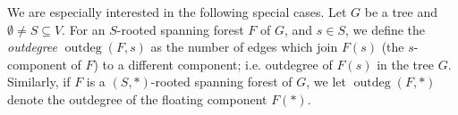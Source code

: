 \documentclass[12pt]{amsart}
\theoremstyle{definition}
\DeclareMathOperator{\outdeg}{outdeg}
\newcommand\farbod[1]{\footnote{[\textcolor{orange}{(Farbod)} \textcolor{blue}{#1}]}}
\begin{document}
We are especially interested in the following special cases. 
Let $G$ be a tree and $\emptyset \ne S \subseteq V$. 
For an $S$-rooted spanning forest $F$ of $G$, and $s \in S$, we define the {\em outdegree} $\outdeg(F,s)$ as the number of edges which join $F(s)$ (the $s$-component of $F$) to a different component; i.e. outdegree of $F(s)$ in the tree $G$. 
Similarly, if $F$ is a $(S,*)$-rooted spanning forest of $G$, we let $\outdeg(F,*)$ denote the outdegree of the floating component $F(*)$.
\end{document}
